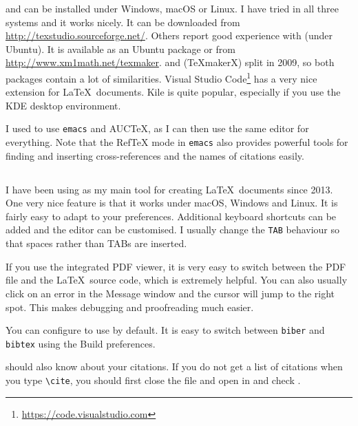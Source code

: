 \TeXstudio{} and
\TeXmaker{} can be installed under Windows, macOS or
Linux. I have tried \TeXstudio in all three systems and it works nicely. It
can be downloaded from \url{http://texstudio.sourceforge.net/}. Others
report good experience with \TeXmaker (under Ubuntu).
It is available as an Ubuntu package or from
\url{http://www.xm1math.net/texmaker}.
\TeXmaker and \TeXstudio (\TeX makerX) split in 2009, so both packages
contain a lot of similarities.
Visual Studio Code\footnote{%
\url{https://code.visualstudio.com}}
has a very nice extension for \LaTeX\ documents.
Kile is quite popular, especially if you use the KDE
desktop environment. 

I used to use \texttt{emacs} and AUCTeX, as I can
then use the same editor for everything. Note that the
RefTeX mode in \texttt{emacs} also provides powerful
tools for finding and inserting cross-references and the names of
citations easily.


\subsection{\TeXstudio}%
\label{sec:app:texstudio}

I have been using \TeXstudio as my main tool for creating \LaTeX\ documents since 2013.
One very nice feature is that it works under macOS, Windows and Linux.
It is fairly easy to adapt to your preferences.
Additional keyboard shortcuts can be added and the editor can be customised.
I usually change the \texttt{TAB} behaviour so that spaces rather than TABs are inserted.

If you use the integrated PDF viewer, it is very easy to switch between the PDF file and
the \LaTeX\ source code, which is extremely helpful.
You can also usually click on an error in the Message window and the cursor will jump to the right spot.
This makes debugging and proofreading much easier.

You can configure \TeXstudio to use  by default.
It is easy to switch between \texttt{biber} and \texttt{bibtex} using the Build preferences.

\TeXstudio should also know about your citations.
If you do not get a list of citations when you type \verb+\cite+,
you should first close the file and open 
in \TeXstudio {} and check .

